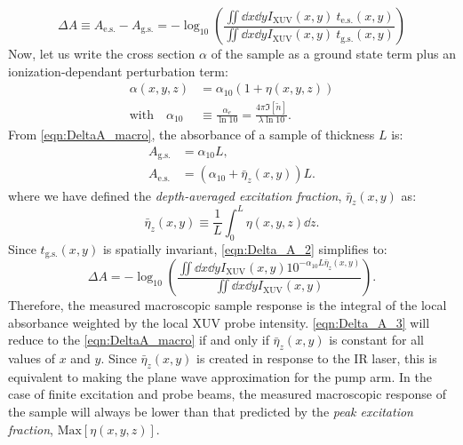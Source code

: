 \begin{equation}
\Delta A \equiv A_{\textrm{e.s.}} - A_{\textrm{g.s.}} = - \log_{10} \left( \frac{\iint \dd{x} \dd{y} I_{\textrm{XUV}}(x,y) \ t_{\textrm{e.s.}}(x,y)}{\iint \dd{x} \dd{y} I_{\textrm{XUV}}(x,y) \ t_{\textrm{g.s.}}(x,y)} \right)
\label{eqn:Delta_A_2}
\end{equation}
Now, let us write the cross section $\alpha$ of the sample as a ground state term plus an ionization-dependant perturbation term:
\begin{equation}
\begin{aligned}
\alpha(x,y,z) &= \alpha_{10} (1 + \eta(x,y,z)) \\
\textrm{with} \quad \alpha_{10} &\equiv \frac{\alpha_e}{\ln 10} = \frac{4 \pi \Im [\tilde{n}]}{\lambda \ln 10}.
\end{aligned}
\end{equation}
From \cref{eqn:DeltaA_macro}, the absorbance of a sample of thickness $L$ is:
\begin{equation}
\begin{aligned}
A_{\textrm{g.s.}} &= \alpha_{10} L, \\
A_{\textrm{e.s.}} &= (\alpha_{10} + \bar{\eta}_z(x,y)) L.
\end{aligned}
\end{equation}
where we have defined the \textit{depth-averaged excitation fraction}, $\bar{\eta}_z(x,y)$ as:
\begin{equation}
\bar{\eta}_z(x,y) \equiv \frac{1}{L} \int_{0}^{L} \eta(x,y,z) \dd{z}.
\label{eqn:eta_z}
\end{equation}
Since $t_{\textrm{g.s.}}(x,y)$ is spatially invariant, \cref{eqn:Delta_A_2} simplifies to:
\begin{equation}
\Delta A = -\log_{10} \left( \frac{ \iint \dd{x} \dd{y} I_{\textrm{XUV}}(x,y) 10^{- \alpha_{10} L \bar{\eta}_z(x,y)}}{ \iint \dd{x} \dd{y} I_{\textrm{XUV}}(x,y)} \right).
\label{eqn:Delta_A_3}
\end{equation}
Therefore, the measured macroscopic sample response is the integral of the local absorbance weighted by the local XUV probe intensity. \cref{eqn:Delta_A_3} will reduce to the \cref{eqn:DeltaA_macro} if and only if $\bar{\eta}_z(x,y)$ is constant for all values of $x$ and $y$. Since $\bar{\eta}_z(x,y)$ is created in response to the IR laser, this is equivalent to making the plane wave approximation for the pump arm. In the case of finite excitation and probe beams, the measured macroscopic response of the sample will always be lower than that predicted by the \textit{peak excitation fraction}, $\textrm{Max}[\eta(x,y,z)]$. 

